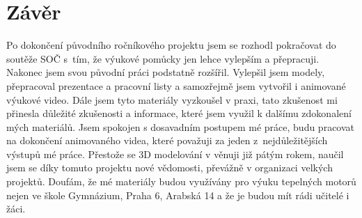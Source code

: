 \section{Závěr}
{Po dokončení původního ročníkového projektu jsem se rozhodl pokračovat do soutěže SOČ s~tím, že výukové pomůcky jen lehce vylepším a přepracuji. Nakonec jsem svou původní práci podstatně rozšířil. Vylepšil jsem modely, přepracoval prezentace a pracovní listy a samozřejmě jsem vytvořil i animované výukové video.}\odst
{Dále jsem tyto materiály vyzkoušel v praxi, tato zkušenost mi přinesla důležité zkušenosti a informace, které jsem využil k dalšímu zdokonalení mých materiálů. Jsem spokojen s dosavadním postupem mé práce, budu pracovat na dokončení animovaného videa, které považuji za jeden z~nejdůležitějších výstupů mé práce.}\odst
{Přestože se 3D modelování v  věnuji již pátým rokem, naučil jsem se díky tomuto projektu nové vědomosti, převážně v organizaci velkých projektů. Doufám, že mé materiály budou využívány pro výuku tepelných motorů nejen ve škole Gymnázium, Praha 6, Arabská 14 a že je budou mít rádi učitelé i žáci.}
